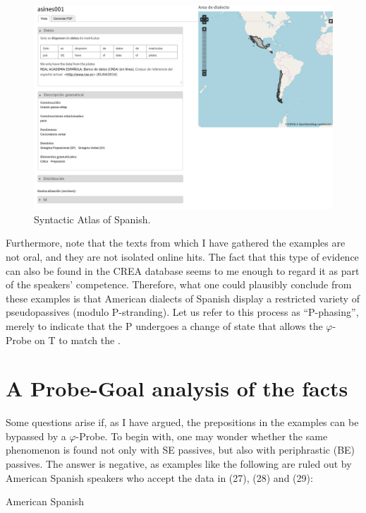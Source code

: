 \documentclass[output=paper]{langsci/langscibook}
\begin{document}
\begin{figure}[t]\caption{Syntactic Atlas of Spanish. \citep{GallegoWebsite}\label{ex:gallego:30}}
\includegraphics[width=\textwidth]{figures/gallego-screenshot.png}
\end{figure}


Furthermore, note that the texts from which I have gathered the examples are not oral, and they are not isolated online hits. The fact that this type of evidence can also be found in the CREA database seems to me enough to regard it as part of the speakers’ competence. Therefore, what one could plausibly conclude from these examples is that American dialects of Spanish display a restricted variety of pseudopassives (modulo P-stranding). Let us refer to this process as “P-phasing”, merely to indicate that the P undergoes a change of state that allows the $\varphi ${}-Probe on T to match the \CATDP. 

\section{A Probe-Goal analysis of the facts}%


Some questions arise if, as I have argued, the prepositions in the examples can be bypassed by a $\varphi ${}-Probe. To begin with, one may wonder whether the same phenomenon is found not only with SE passives, but also with periphrastic (BE) passives. The answer is negative, as examples like the following are ruled out by American Spanish speakers who accept the data in  (27), (28) and (29):



\ea%
    American Spanish\label{ex:gallego:31}\\
    \z
\z    
\end{document}
